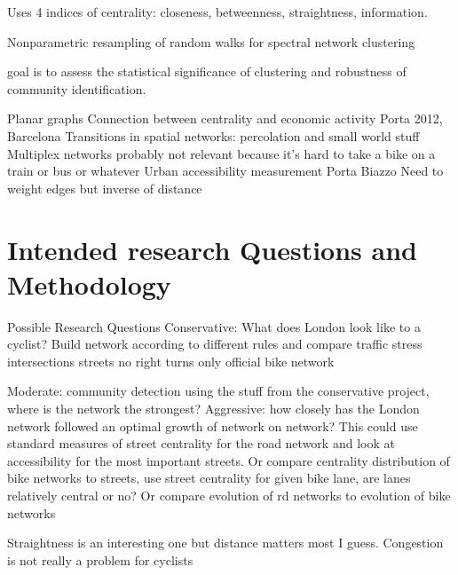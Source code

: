 \documentclass[11pt]{article} %
\begin{document}
Uses 4 indices of centrality: closeness, betweenness, straightness, information. 
\cite{crucitti2006centrality}


Nonparametric resampling of random walks for spectral network clustering

goal is to assess the statistical significance of clustering and robustness of community identification. 
\cite{fallani2014nonparametric}


\cite{feliciotti2016design}

\cite{}

\cite{}

\cite{}

\cite{}

\cite{}

Planar graphs
Connection between centrality and economic activity
	Porta 2012, Barcelona
Transitions in spatial networks: percolation and small world stuff
Multiplex networks probably not relevant because it's hard to take a bike on a train or bus or whatever
	Urban accessibility measurement
		Porta 
		Biazzo
		Need to weight edges but inverse of distance




\section{Intended research Questions and Methodology}


Possible Research Questions
	Conservative: What does London look like to a cyclist? Build network according to different rules and compare
		traffic stress
			intersections
			streets
		no right turns
		only official bike network
			
	Moderate: community detection using the stuff from the conservative project, where is the network the strongest?
	Aggressive: how closely has the London network followed an optimal growth of network on network? 
		This could use standard measures of street centrality for the road network and look at accessibility for the most important streets. 
		Or compare centrality distribution of bike networks to streets, use street centrality for given bike lane, are lanes relatively central or no? 
		Or compare evolution of rd networks to evolution of bike networks
		
Straightness is an interesting one but distance matters most I guess. 
Congestion is not really a problem for cyclists
\end{document}
